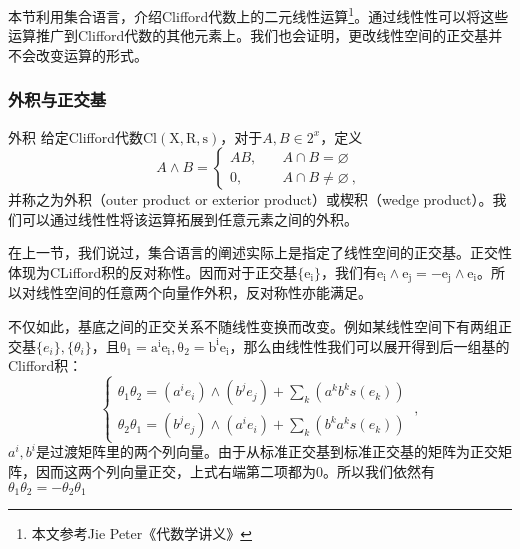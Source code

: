 



本节利用集合语言，介绍Clifford代数上的二元线性运算\footnote{本文参考Jie Peter《代数学讲义》}。通过线性性可以将这些运算推广到Clifford代数的其他元素上。我们也会证明，更改线性空间的正交基并不会改变运算的形式。
\subsubsection{外积与正交基}
\begin{definition}{外积}
给定Clifford代数$\mathrm {Cl(X,R,s)}$，对于$A,B\in 2^x$，定义
\begin{equation}
A \wedge B=\left\{\begin{aligned}
A B,\quad& A \cap B=\varnothing \\
0,\quad& A \cap B \neq \varnothing~,
\end{aligned}\right.
\end{equation}
并称之为外积（outer product or exterior product）或楔积（wedge product）。我们可以通过线性性将该运算拓展到任意元素之间的外积。
\end{definition}

在上一节，我们说过，集合语言的阐述实际上是指定了线性空间的正交基。正交性体现为CLifford积的反对称性。因而对于正交基$\{\mathrm {e_i}\}$，我们有$\mathrm{e_i\wedge e_j=-e_j\wedge e_i}$。所以对线性空间的任意两个向量作外积，反对称性亦能满足。

不仅如此，基底之间的正交关系不随线性变换而改变。例如某线性空间下有两组正交基$\{e_i\},\{\theta_i\}$，且$\mathrm {\theta_1=a^ie_i,\theta_2=b^ie_i}$，那么由线性性我们可以展开得到后一组基的Clifford积：
\begin{equation}
\left\{\begin{array}{l}
\theta_1 \theta_2=\left(a^i e_i\right) \wedge\left(b^j e_j\right)+\sum_k\left(a^k b^k s(e_k)\right) \\
\theta_2 \theta_1=\left(b^j e_j\right) \wedge\left(a^i e_i\right)+\sum_k\left(b^k a^k s(e_k)\right)
\end{array}\right.~,
\end{equation}
$a^i,b^i$是过渡矩阵里的两个列向量。由于从标准正交基到标准正交基的矩阵为正交矩阵，因而这两个列向量正交，上式右端第二项都为0。所以我们依然有$\theta_1\theta_2=-\theta_2\theta_1$
